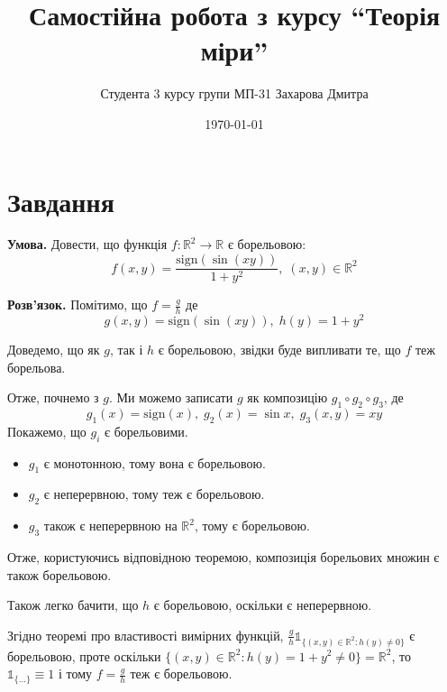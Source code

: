 \documentclass[14pt]{extarticle}
\title{Самостійна робота з курсу ``Теорія міри''}
\author{Студента 3 курсу групи МП-31 Захарова Дмитра}
\date{\today}
\begin{document}
\maketitle

\section*{Завдання}
\textbf{Умова.} Довести, що функція $f: \mathbb{R}^2 \to \mathbb{R}$ є борельовою:
\[
f(x,y) = \frac{\text{sign}\left( \sin (xy)\right)}{1+y^2}, \; (x,y) \in \mathbb{R}^2
\]

\textbf{Розв'язок.} Помітимо, що $f = \frac{g}{h}$ де
\[
g(x,y) = \text{sign}\left(\sin(xy)\right), \; h(y) = 1+y^2
\]

Доведемо, що як $g$, так і $h$ є борельовою, звідки буде випливати те, що $f$ теж борельова. 

Отже, почнемо з $g$. Ми можемо записати $g$ як композицію $g_1 \circ g_2 \circ g_3$, де
\[
g_1(x) = \text{sign}(x), \; g_2(x) = \sin x, \; g_3(x,y) = xy
\]
Покажемо, що $g_i$ є борельовими. 

\begin{itemize}
    \item  $g_1$ є монотонною, тому вона є борельовою.
    \item $g_2$ є неперервною, тому теж є борельовою.
    \item $g_3$ також є неперервною на $\mathbb{R}^2$, тому є борельовою. 
\end{itemize}

Отже, користуючись відповідною теоремою, композиція борельових множин є також борельовою. 

Також легко бачити, що $h$ є борельовою, оскільки є неперервною. 

Згідно теоремі про властивості вимірних функцій, $\frac{g}{h}\mathds{1}_{\{(x,y) \in \mathbb{R}^2: h(y) \neq 0\}}$ є борельовою, проте оскільки $\{(x,y) \in \mathbb{R}^2: h(y)=1+y^2 \neq 0\} = \mathbb{R}^2$, то $\mathds{1}_{\{\dots\}} \equiv 1$ і тому $f=\frac{g}{h}$ теж є борельовою. 
\end{document}

